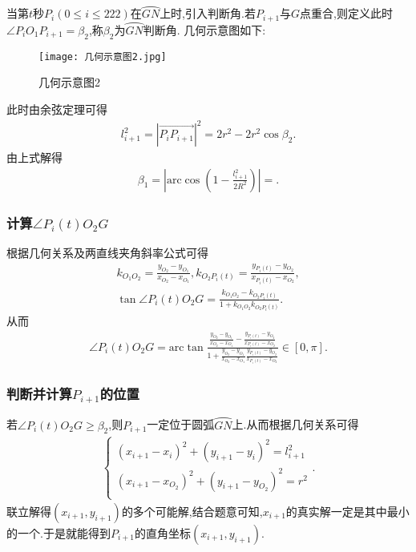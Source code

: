\documentclass[lang=cn,newtx,10pt,scheme=chinese]{../Template/elegantbook}
\begin{document}
当第$t$秒$P_i(0\leq i\leq 222)$在$\wideparen{GN}$上时,引入判断角.若$P_{i+1}$与$G$点重合,则定义此时$\angle P_iO_1P_{i+1}=\beta_2$,称$\beta_2$为$\wideparen{GN}$判断角. 几何示意图如下:
\begin{figure}[htbp]
\centering
\texttt{[image: 几何示意图2.jpg]}
\caption{几何示意图2}
\label{figure3}
\end{figure}
此时由余弦定理可得
\begin{align}
l_{i+1}^{2}=\left| \overrightarrow{P_iP_{i+1}} \right|^2=2r^2-2r^2\cos \beta _2.
\end{align}
由上式解得
\begin{align}
\beta _1=\left| \mathrm{arc}\cos \left( 1-\frac{l_{i+1}^{2}}{2R^2} \right) \right|=.
\end{align}


\subsubsection{计算$\angle P_{i}(t)O_2G$}

根据几何关系及两直线夹角斜率公式可得
\begin{gather}
k_{O_1O_2}=\frac{y_{O_2}-y_{O_1}}{x_{O_2}-x_{O_1}},k_{O_2P_i\left( t \right)}=\frac{y_{P_i\left( t \right)}-y_{O_2}}{x_{P_i\left( t \right)}-x_{O_2}},
\\
\tan \angle P_i(t)O_2G=\frac{k_{O_1O_2}-k_{O_2P_i\left( t \right)}}{1+k_{O_1O_2}k_{O_2P_i\left( t \right)}}.
\end{gather}
从而
\begin{align}
\angle P_i(t)O_2G=\mathrm{arc}\tan \frac{\frac{y_{O_2}-y_{O_1}}{x_{O_2}-x_{O_1}}-\frac{y_{P_i\left( t \right)}-y_{O_2}}{x_{P_i\left( t \right)}-x_{O_2}}}{1+\frac{y_{O_2}-y_{O_1}}{x_{O_2}-x_{O_1}}\frac{y_{P_i\left( t \right)}-y_{O_2}}{x_{P_i\left( t \right)}-x_{O_2}}}\in[0,\pi].
\end{align}


\subsubsection{判断并计算$P_{i+1}$的位置}

若$\angle P_i(t)O_2G\geq \beta_2$,则$P_{i+1}$一定位于圆弧$\wideparen{GN}$上.从而根据几何关系可得
\begin{align}
\left\{ \begin{array}{c}
\left( x_{i+1}-x_i \right) ^2+\left( y_{i+1}-y_i \right) ^2=l_{i+1}^{2}\\
\left( x_{i+1}-x_{O_2} \right) ^2+\left( y_{i+1}-y_{O_2} \right) ^2=r^2\\
\end{array} \right. .
\end{align}
联立解得$(x_{i+1},y_{i+1})$的多个可能解,结合题意可知,$x_{i+1}$的真实解一定是其中最小的一个.于是就能得到$P_{i+1}$的直角坐标$(x_{i+1},y_{i+1})$.
\end{document}
